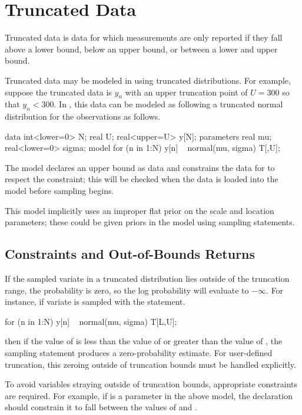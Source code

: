 \section{Truncated Data}\label{truncated-data.section}

Truncated data is data for which measurements are only reported if
they fall above a lower bound, below an upper bound, or between a
lower and upper bound.  

Truncated data may be modeled in \Stan using truncated distributions.
For example, suppose the truncated data is $y_n$ with an upper
truncation point of $U = 300$ so that $y_n < 300$.  In \Stan, this
data can be modeled as following a truncated normal distribution for
the observations as follows. 
%
\begin{stancode}
data {
  int<lower=0> N;
  real U;
  real<upper=U> y[N];
} 
parameters {
  real mu;
  real<lower=0> sigma;
} 
model {
  for (n in 1:N)
    y[n] ~ normal(mu, sigma) T[,U];
}
\end{stancode}
% 
The model declares an upper bound  as data and constrains
the data for  to respect the constraint;  this will be checked
when the data is loaded into the model before sampling begins.

This model implicitly uses an improper flat prior on the scale and
location parameters; these could be given priors in the model using
sampling statements.

\subsection{Constraints and Out-of-Bounds Returns}

If the sampled variate in a truncated distribution lies outside of
the truncation range, the probability is zero, so the log probability
will evaluate to $-\infty$.  For instance, if variate  is
sampled with the statement.
%
\begin{stancode}
for (n in 1:N) 
  y[n] ~ normal(mu, sigma) T[L,U];
\end{stancode}
%
then if the value of  is less than the value of 
or greater than the value of , the sampling statement produces
a zero-probability estimate.  For user-defined truncation, this
zeroing outside of truncation bounds must be handled explicitly.

To avoid variables straying outside of truncation bounds, appropriate
constraints are required.  For example, if  is a parameter in
the above model, the declaration should constrain it to fall between
the values of  and .
%
\begin{stancode}
parameters {
  real<lower=L,upper=U> y[N];
  ...
\end{stancode}

